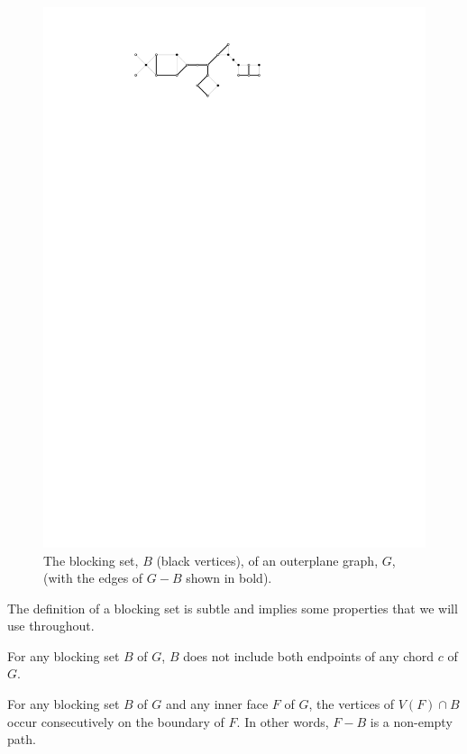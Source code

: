 \documentclass{patmorin}
\begin{document}
\begin{figure}
  \begin{center}
     \includegraphics{figs/blocking-set-1}
  \end{center}
  \caption{The blocking set, $B$ (black vertices), of an outerplane graph,
     $G$,  (with the edges of $G-B$ shown in bold).}
\end{figure}

The definition of a blocking set is subtle and implies some properties
that we will use throughout.   

\begin{obs}
   For any blocking set $B$ of $G$, $B$ does not include both endpoints
   of any chord $c$ of $G$. 
\end{obs}

\begin{obs}
   For any blocking set $B$ of $G$ and any inner face $F$ of $G$, the
   vertices of $V(F)\cap B$ occur consecutively on the boundary of $F$. 
   In other words, $F-B$ is a non-empty path.  
\end{obs}
\end{document}
